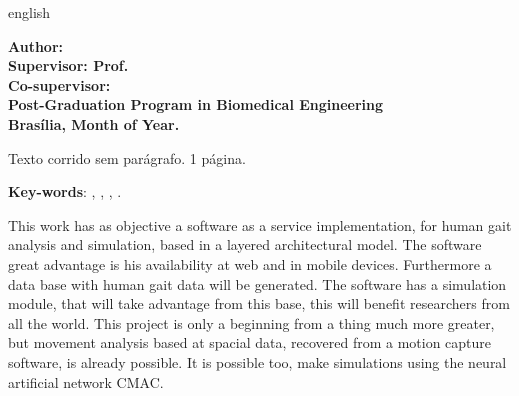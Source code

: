 \begin{resumo}[Abstract]
 \begin{otherlanguage*}{english}

 \begin{center}
\textbf{\imprimirTitle}
\end{center}

\begin{flushleft}
\footnotesize
\textbf{Author: \imprimirautor}\\
\textbf{Supervisor: Prof. \imprimirorientador} \\
\textbf{Co-supervisor: \imprimirmembroCoorientador} \\
\textbf{Post-Graduation Program in Biomedical Engineering} \\
\textbf{Brasília, Month of Year.}\newline
\end{flushleft}
 
Texto corrido sem parágrafo. 1 página.

   \vspace{\onelineskip}
 
   \noindent 
   \textbf{Key-words}: 	\imprimirpalavrachaveumingles, \imprimirpalavrachavedoisingles, 
			\imprimirpalavrachavetresingles, \imprimirpalavrachavequatroingles.

This work has as objective a software as a service implementation, for human gait analysis and simulation, based in a layered architectural model. The software great advantage is his availability at web and in mobile devices. Furthermore a data base with human gait data will be generated. The software has a simulation module, that will take advantage from this base, this will benefit researchers from all the world. This project is only a beginning from a thing much more greater, but movement analysis based at spacial data, recovered from a motion capture software, is already possible. It is possible too, make simulations using the neural artificial network CMAC.

 \end{otherlanguage*}
\end{resumo}
